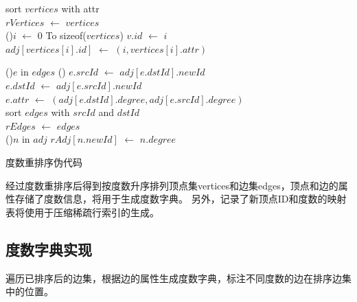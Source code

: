 \documentclass[master]{thesis-uestc}
\begin{document}
\begin{algorithm}
    sort $vertices$ with attr \\
    $rVertices$ $\leftarrow$ $vertices$\\
    
    \For(){$i$ $\leftarrow$ 0 To sizeof($vertices$)}{
        $v.id$ $\leftarrow$ $i$\\
        $adj[vertices[i].id]$ $\leftarrow$ $(i, vertices[i].attr)$\\
    }
    
    \For(){$e$ in $edges$}{
        \Else(){
            $e.srcId$ $\leftarrow$ $adj[e.dstId].newId$\\
            $e.dstId$ $\leftarrow$ $adj[e.srcId].newId$\\
            $e.attr$ $\leftarrow$ $(adj[e.dstId].degree, adj[e.srcId].degree)$\\
        }
    }
    sort $edges$ with $srcId$ and $dstId$\\
    $rEdges$ $\leftarrow$ $edges$\\
    
    \For(){$n$ in $adj$}{
        $rAdj[n.newId]$ $\leftarrow$ $n.degree$
    }
    \caption{度数重排序伪代码}
    \label{alg:degree-reorder}
\end{algorithm}

    经过度数重排序后得到按度数升序排列顶点集vertices和边集edges，顶点和边的属性存储了度数信息，将用于生成度数字典。
另外，记录了新顶点ID和度数的映射表将使用于压缩稀疏行索引的生成。

\subsection{度数字典实现}
\label{subsec:deg-dic-impl}
    遍历已排序后的边集，根据边的属性生成度数字典，标注不同度数的边在排序边集中的位置。
\end{document}
